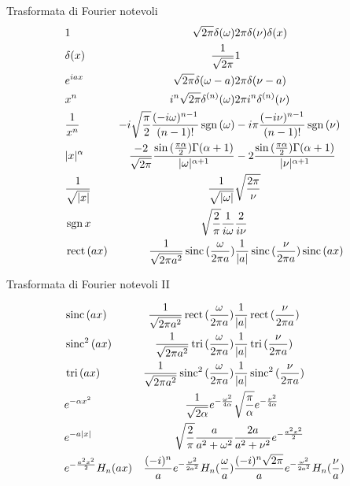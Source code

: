 \begin{wordonframe}{Trasformata di Fourier notevoli}
\begin{align*}
& 1 & \sqrt{2\pi}\delta(\omega) & 2\pi\delta(\nu)\delta(x)\\
& \delta(x) & \frac{1}{\sqrt{2\pi}} & 1\\
& e^{iax} & \sqrt{2\pi}\delta(\omega-a) & 2\pi\delta(\nu-a)\\
& x^n & i^n\sqrt{2\pi}\delta^{(n)}(\omega) & 2\pi i^n\delta^{(n)}(\nu)\\
& \frac{1}{x^n} & -i\sqrt{\frac{\pi}{2}}\frac{(-i\omega)^{n-1}}{(n-1)!}\operatorname{sgn}{(\omega)} & -i\pi\frac{(-i\nu)^{n-1}}{(n-1)!}\operatorname{sgn}{(\nu)}\\
& |x|^{\alpha} & \frac{-2}{\sqrt{2\pi}}\frac{\sin{(\frac{\pi\alpha}{2})}\Gamma(\alpha+1)}{|\omega|^{\alpha+1}} & -2\frac{\sin{(\frac{\pi\alpha}{2})}\Gamma(\alpha+1)}{|\nu|^{\alpha+1}}\\
& \frac{1}{\sqrt{|x|}} & \frac{1}{\sqrt{|\omega|}} & \sqrt{\frac{2\pi}{\nu}}\\
& \operatorname{sgn}{x} & \sqrt{\frac{2}{\pi}}\frac{1}{i\omega} & \frac{2}{i\nu}\\
& \operatorname{rect}{(ax)} & \frac{1}{\sqrt{2\pi a^2}}\operatorname{sinc}{(\frac{\omega}{2\pi a})} &  \frac{1}{|a|}\operatorname{sinc}{(\frac{\nu}{2\pi a})}\operatorname{sinc}{(ax)}\\
\end{align*}

\end{wordonframe}

\begin{wordonframe}{Trasformata di Fourier notevoli II}

\begin{align*}
&\operatorname{sinc}{(ax)} & \frac{1}{\sqrt{2\pi a^2}}\operatorname{rect}{(\frac{\omega}{2\pi a})} &  \frac{1}{|a|}\operatorname{rect}{(\frac{\nu}{2\pi a})}\\
&\operatorname{sinc}^2{(ax)} & \frac{1}{\sqrt{2\pi a^2}}\operatorname{tri}{(\frac{\omega}{2\pi a})} &  \frac{1}{|a|}\operatorname{tri}{(\frac{\nu}{2\pi a})}\\
&\operatorname{tri}{(ax)} & \frac{1}{\sqrt{2\pi a^2}}\operatorname{sinc}^2{(\frac{\omega}{2\pi a})} &  \frac{1}{|a|}\operatorname{sinc}^2{(\frac{\nu}{2\pi a})}\\
&e^{-\alpha x^2} & \frac{1}{\sqrt{2\alpha}}e^{-\frac{\omega^2}{4\alpha}} & \sqrt{\frac{\pi}{\alpha}}e^{-\frac{\nu^2}{4\alpha}}\\
&e^{-a|x|} & \sqrt{\frac{2}{\pi}}\frac{a}{a^2+\omega^2} & \frac{2a}{a^2+\nu^2}e^{-\frac{a^2x^2}{2}}\\
&e^{-\frac{a^2x^2}{2}}H_n(ax) & \frac{(-i)^n}{a}e^{-\frac{\omega^2}{2a^2}}H_n(\frac{\omega}{a}) & \frac{(-i)^n\sqrt{2\pi}}{a}e^{-\frac{\omega^2}{2a^2}}H_n(\frac{\nu}{a})
\end{align*}
\end{wordonframe}

